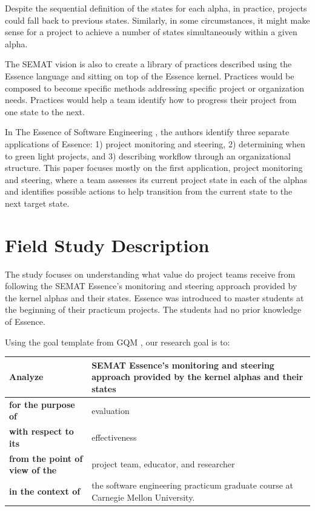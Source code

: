Despite the sequential definition of the states for each alpha, in practice, projects could fall back to previous states. Similarly, in some circumstances, it might make sense for a project to achieve a number of states simultaneously within a given alpha.

The SEMAT vision is also to create a library of practices described using the Essence language and sitting on top of the Essence kernel. Practices would be composed to become specific methods addressing specific project or organization needs. Practices would help a team identify how to progress their project from one state to the next.

In The Essence of Software Engineering \cite{EssenceBook}, the authors identify three separate applications of Essence: 1) project monitoring and steering, 2) determining when to green light projects, and 3) describing workflow through an organizational structure. This paper focuses mostly on the first application, project monitoring and steering, where a team assesses its current project state in each of the alphas and identifies possible actions to help transition from the current state to the next target state.

\section{Field Study Description}
\label{Field Study Description}

The study focuses on understanding what value do project teams receive from following the SEMAT Essence's monitoring and steering approach provided by the kernel alphas and their states. Essence was introduced to master students at the beginning of their practicum projects. The students had no prior knowledge of Essence.

Using the goal template from GQM \cite{GQM}, our research goal is to:

\begin{table}[h]
\renewcommand{\arraystretch}{1.3}
\centering
\begin{tabular}{|p{1.20in}|p{1.90in}|}
\hline
\textbf{Analyze} & SEMAT Essence's monitoring and steering approach provided by the kernel alphas and their states \\ \hline
\textbf{for the purpose of} & evaluation \\ \hline
\textbf{with respect to its} & effectiveness \\ \hline
\textbf{from the point of view of the} & project team, educator, and researcher \\ \hline
\textbf{in the context of} & the software engineering practicum graduate course at Carnegie Mellon University. \\
\hline
\end{tabular}
\end{table}
 
